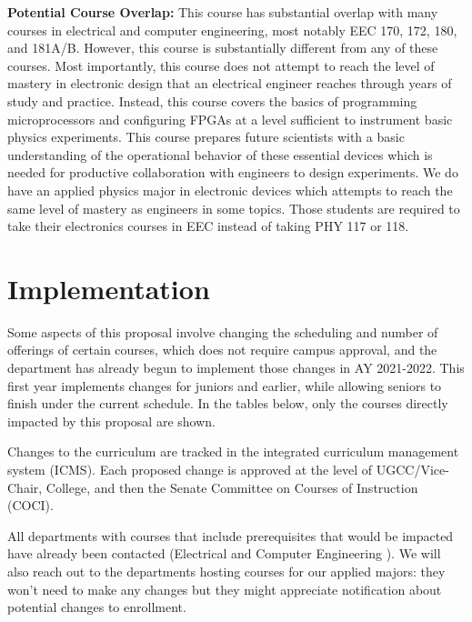 \documentclass[12pt]{article}
\begin{document}
{\bf Potential Course Overlap:} This course has substantial overlap
with many courses in electrical and computer engineering, most notably
EEC 170, 172, 180, and 181A/B.  However, this course is substantially
different from any of these courses.  Most importantly, this course
does not attempt to reach the level of mastery in electronic design
that an electrical engineer reaches through years of study and
practice.  Instead, this course covers the basics of programming
microprocessors and configuring FPGAs at a level sufficient to
instrument basic physics experiments.  This course prepares future
scientists with a basic understanding of the operational behavior of
these essential devices which is needed for productive collaboration
with engineers to design experiments.  We do have an applied physics
major in electronic devices which attempts to reach the same level of
mastery as engineers in some topics.  Those students are required to
take their electronics courses in EEC instead of taking PHY 117 or
118.

\newpage

\section{Implementation}
\label{sec:implementation}

Some aspects of this proposal involve changing the scheduling and
number of offerings of certain courses, which does not require campus
approval, and the department has already begun to implement those
changes in AY 2021-2022.  This first year implements changes for
juniors and earlier, while allowing seniors to finish under the
current schedule.  In the tables below, only the courses directly
impacted by this proposal are shown.

Changes to the curriculum are tracked in the integrated curriculum
management system (ICMS).  Each proposed change is approved at the
level of UGCC/Vice-Chair, College, and then the Senate Committee on
Courses of Instruction (COCI).

All departments with courses that include prerequisites that would be
impacted have already been contacted (Electrical and Computer
Engineering ).  We will also reach out to the departments hosting
courses for our applied majors: they won't need to make any changes
but they might appreciate notification about potential changes to
enrollment.
\end{document}
